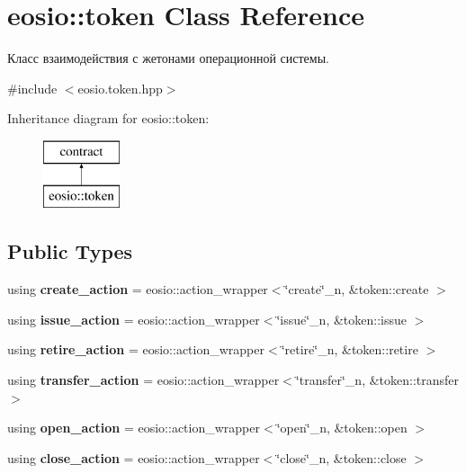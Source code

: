 \hypertarget{classeosio_1_1token}{}\section{eosio\+:\+:token Class Reference}
\label{classeosio_1_1token}


Класс взаимодействия с жетонами операционной системы.  




{\ttfamily \#include $<$eosio.\+token.\+hpp$>$}

Inheritance diagram for eosio\+:\+:token\+:\begin{figure}[H]
\begin{center}
\leavevmode
\includegraphics[height=2.000000cm]{classeosio_1_1token}
\end{center}
\end{figure}
\subsection*{Public Types}
\begin{DoxyCompactItemize}
\item 
\mbox{\label{classeosio_1_1token_ab6f5f8e8c550b3ae9492fcde3f04458a}} 
using {\bfseries create\+\_\+action} = eosio\+::action\+\_\+wrapper$<$\char`\"{}create\char`\"{}\+\_\+n, \&token\+::create $>$
\item 
\mbox{\label{classeosio_1_1token_a0a264928ea4b4c3056884cc95c9bea49}} 
using {\bfseries issue\+\_\+action} = eosio\+::action\+\_\+wrapper$<$\char`\"{}issue\char`\"{}\+\_\+n, \&token\+::issue $>$
\item 
\mbox{\label{classeosio_1_1token_adebe02a32df2bf3ca7f27eec264b32c4}} 
using {\bfseries retire\+\_\+action} = eosio\+::action\+\_\+wrapper$<$\char`\"{}retire\char`\"{}\+\_\+n, \&token\+::retire $>$
\item 
\mbox{\label{classeosio_1_1token_a48e0c826f1e416bf99439b0b7e637a29}} 
using {\bfseries transfer\+\_\+action} = eosio\+::action\+\_\+wrapper$<$\char`\"{}transfer\char`\"{}\+\_\+n, \&token\+::transfer $>$
\item 
\mbox{\label{classeosio_1_1token_aee1aaa798e4d4a973b40a5a4b95d2a21}} 
using {\bfseries open\+\_\+action} = eosio\+::action\+\_\+wrapper$<$\char`\"{}open\char`\"{}\+\_\+n, \&token\+::open $>$
\item 
\mbox{\label{classeosio_1_1token_a3e49a7888cde765dfe8f4966b3067036}} 
using {\bfseries close\+\_\+action} = eosio\+::action\+\_\+wrapper$<$\char`\"{}close\char`\"{}\+\_\+n, \&token\+::close $>$
\end{DoxyCompactItemize}
